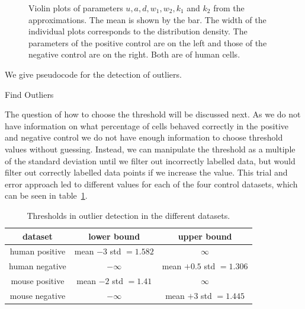 \begin{figure}[h!]
	\caption{Violin plots of parameters $u, a, d, w_1, w_2, k_1$ and $k_2$ from the approximations. The mean is shown by the bar. The width of the individual plots corresponds to the distribution density. The parameters of the positive control are on the left and those of the negative control are on the right. Both are of human cells.}
	\label{fig:parameter_violin_plot}
\end{figure}

We give pseudocode for the detection of outliers.
\newpage

\begin{algorithm}[H] \label{alg:outlier_detection}
	\SetAlgoLined
	\DontPrintSemicolon
	\LinesNumbered
	\caption{Find Outliers}
	
	
	\BlankLine
\end{algorithm}
\vspace{1cm}

The question of how to choose the threshold will be discussed next. As we do not have information on what percentage of cells behaved correctly in the positive and negative control we do not have enough information to choose threshold values without guessing. Instead, we can manipulate the threshold as a multiple of the standard deviation until we filter out incorrectly labelled data, but would filter out correctly labelled data points if we increase the value. This trial and error approach led to different values for each of the four control datasets, which can be seen in table~\ref{tab:threshold_outlier}.

\begin{table}[h!]
	\centering
	\begin{tabular}{|c|c|c|}
		\hline
		dataset & lower bound & upper bound \\
		\hline
		human positive & mean $ - 3$ std $ = 1.582$ & $\infty$ \\
		\hline
		human negative & $-\infty$ & mean $ + 0.5$ std $ = 1.306$ \\
		\hline
		mouse positive & mean $ - 2$ std $ = 1.41$ & $\infty$ \\
		\hline
		mouse negative & $-\infty$ & mean $ + 3$ std $ = 1.445$ \\
		\hline
	\end{tabular}
	\caption{Thresholds in outlier detection in the different datasets.}
	\label{tab:threshold_outlier}
\end{table}

